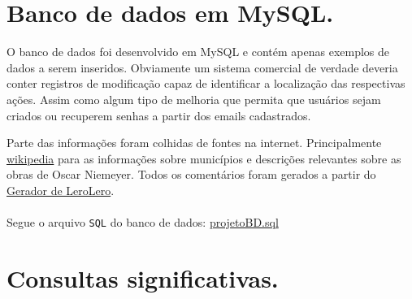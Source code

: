 \documentclass[12pt,a4paper]{article}
\begin{document}
\newpage

\section{Banco de dados em MySQL.}

O banco de dados foi desenvolvido em MySQL e contém apenas exemplos de dados a serem inseridos. Obviamente um sistema comercial de verdade deveria conter registros de modificação capaz de identificar a localização das respectivas ações. Assim como algum tipo de melhoria que permita que usuários sejam criados ou recuperem senhas a partir dos emails cadastrados.

Parte das informações foram colhidas de fontes na internet. Principalmente \href{http://wikipedia.org/}{wikipedia} para as informações sobre municípios e descrições relevantes sobre as obras de Oscar Niemeyer. Todos os comentários foram gerados a partir do \href{http://www.lerolero.com/}{Gerador de LeroLero}.
\\
\\
Segue o arquivo \verb+SQL+ do banco de dados: \url{projetoBD.sql}

\section{Consultas significativas.}
\end{document}
